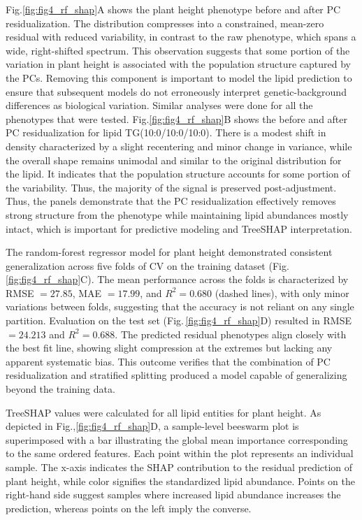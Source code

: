 \documentclass[10pt,letterpaper]{article}
\begin{document}
\begin{itemize}
Fig.\ref{fig:fig4_rf_shap}A shows the plant height phenotype before and after PC residualization. The distribution compresses into a constrained, mean-zero residual with reduced variability, in contrast to the raw phenotype, which spans a wide, right-shifted spectrum. This observation suggests that some portion of the variation in plant height is associated with the population structure captured by the PCs. Removing this component is important to model the lipid prediction to ensure that subsequent models do not erroneously interpret genetic-background differences as biological variation. Similar analyses were done for all the phenotypes that were tested. Fig.\ref{fig:fig4_rf_shap}B shows the before and after PC residualization for lipid TG(10:0/10:0/10:0). There is a modest shift in density characterized by a slight recentering and minor change in variance, while the overall shape remains unimodal and similar to the original distribution for the lipid. It indicates that the population structure accounts for some portion of the variability. Thus, the majority of the signal is preserved post-adjustment. Thus, the panels demonstrate that the PC residualization effectively removes strong structure from the phenotype while maintaining lipid abundances mostly intact, which is important for predictive modeling and TreeSHAP interpretation.

The random-forest regressor model for plant height demonstrated consistent generalization across five folds of CV on the training dataset (Fig. \ref{fig:fig4_rf_shap}C). The mean performance across the folds is characterized by RMSE $=27.85$, MAE $=17.99$, and $R^2=0.680$ (dashed lines), with only minor variations between folds, suggesting that the accuracy is not reliant on any single partition. Evaluation on the test set (Fig.\,\ref{fig:fig4_rf_shap}D) resulted in RMSE $=24.213$ and $R^2=0.688$. The predicted residual phenotypes align closely with the best fit line, showing slight compression at the extremes but lacking any apparent systematic bias. This outcome verifies that the combination of PC residualization and stratified splitting produced a model capable of generalizing beyond the training data.

TreeSHAP values were calculated for all lipid entities for plant height. As depicted in Fig.,\ref{fig:fig4_rf_shap}D, a sample-level beeswarm plot is superimposed with a bar illustrating the global mean importance corresponding to the same ordered features. Each point within the plot represents an individual sample. The x-axis indicates the SHAP contribution to the residual prediction of plant height, while color signifies the standardized lipid abundance. Points on the right-hand side suggest samples where increased lipid abundance increases the prediction, whereas points on the left imply the converse. 


\end{itemize}
\end{document}
